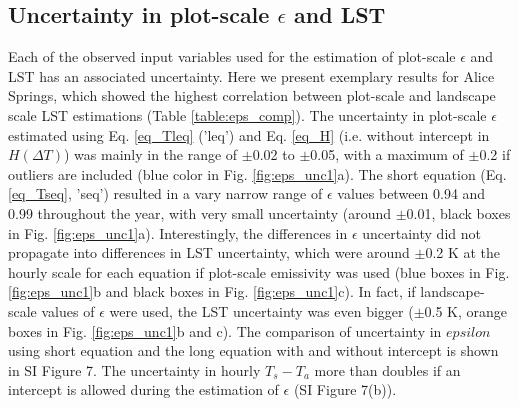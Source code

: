 \documentclass[fleqn,10pt]{wlscirep}
\begin{document}
\subsection{Uncertainty in plot-scale $\epsilon$ and LST}
Each of the observed input variables used for the estimation of plot-scale $\epsilon$ and LST has an associated uncertainty. Here we present exemplary results for Alice Springs, which showed the highest correlation between plot-scale and landscape scale LST estimations (Table \ref{table:eps_comp}).
The uncertainty in plot-scale $\epsilon$ estimated using Eq. \ref{eq_Tleq} ('leq') and Eq. \ref{eq_H} (i.e. without intercept in $H(\Delta  T)$) was mainly in the range of $\pm$0.02 to $\pm$0.05, with a maximum of $\pm$0.2 if outliers are included (blue color in Fig. \ref{fig:eps_unc1}a). The short equation (Eq.\ref{eq_Tseq}, 'seq') resulted in a vary narrow range of $\epsilon$ values between 0.94 and 0.99 throughout the year, with very small uncertainty (around $\pm$0.01, black boxes in Fig. \ref{fig:eps_unc1}a). Interestingly, the differences in $\epsilon$ uncertainty did not propagate into differences in LST uncertainty, which were around $\pm$0.2 K at the hourly scale for each equation if plot-scale emissivity was used (blue boxes in Fig. \ref{fig:eps_unc1}b and black boxes in Fig. \ref{fig:eps_unc1}c). In fact, if landscape-scale values of $\epsilon$ were used, the LST uncertainty was even bigger ($\pm$0.5 K, orange boxes in Fig. \ref{fig:eps_unc1}b and c). The comparison of uncertainty in $epsilon$ using short equation and the long equation with and without intercept is shown in SI Figure 7. The uncertainty in hourly $T_{s} -T_{a}$ more than doubles if an intercept is allowed during the estimation of $\epsilon$ (SI Figure 7(b)).
\end{document}
